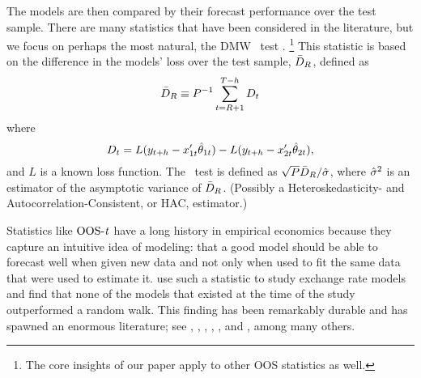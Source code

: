 \documentclass[12pt]{article}
\begin{document}
The models are then compared by their forecast performance over the test
sample. There are many statistics that have been considered in the
literature, but we focus on perhaps the most natural, the DMW \oost\
test \citep{DiM:95,Wes:96}.%
\footnote{The core insights of our paper apply to other OOS statistics
  as well.} %
This statistic is based on
the difference in the models' loss over the test sample, $\bar{D}_{R}$,
defined as
\begin{equation}
  \bar{D}_{R} \equiv P^{-1} \sum_{t=R+1}^{T-h} D_t
\end{equation}
where
\begin{equation}\label{eq:16}
  D_t = L(y_{t+h} - x_{1t}'\hat\theta_{1t}) - L(y_{t+h} - x_{2t}'\hat\theta_{2t}),
\end{equation}
and $L$ is a known loss function. The \oost\ test is defined as
$\sqrt{P} \bar{D}_{R} / \hat{\sigma}$, where $\hat{\sigma}^2$ is an estimator of the
asymptotic variance of $\bar{D}_{R}$. (Possibly a Heteroskedasticity- and
Autocorrelation-Consistent, or HAC, estimator.)

Statistics like $\operatorname{OOS-\mathit{t}}$ have a long history in empirical economics
because they capture an intuitive idea of modeling: that a good model
should be able to forecast well when given new data and not only when
used to fit the same data that were used to estimate it. \cite{MeR:83}
use such a statistic to study exchange rate models and find that none
of the models that existed at the time of the study outperformed a
random walk. This finding has been remarkably durable and has spawned
an enormous literature; see \cite{Mar:95}, \cite{KiT:03},
\cite{CCP:05}, \cite{EnW:05}, \cite{Ros:05}, and \cite{BWB:10}, among
many others.
\end{document}
